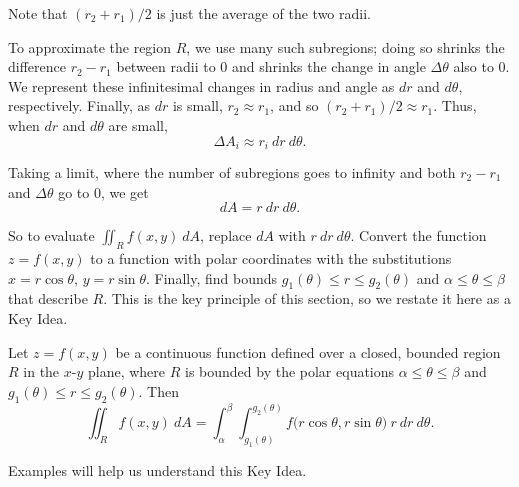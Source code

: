 Note that $(r_2+r_1)/2$ is just the average of the two radii. 

To approximate the region $R$, we use many such subregions; doing so shrinks the difference $r_2-r_1$ between radii to 0 and shrinks the change in angle $\Delta \theta$ also to 0. We represent these infinitesimal changes in radius and angle as $dr$ and $d\theta$, respectively. Finally, as $dr$ is small, $r_2\approx r_1$, and so $(r_2+r_1)/2\approx r_1$. Thus, when $dr$ and $d\theta$ are small, 
\[
\Delta A_i \approx r_i\ dr\ d\theta.
\]

Taking a limit, where the number of subregions goes to infinity and both $r_2-r_1$ and $\Delta\theta$ go to 0, we get 
\[
dA = r\ dr\ d\theta.
\]

So to evaluate $\iint_Rf(x,y)\ dA$, replace $dA$ with $r\ dr\ d\theta$. Convert the function $z=f(x,y)$ to a function with polar coordinates with the substitutions $x=r\cos\theta$, $y=r\sin\theta$. Finally, find bounds $g_1(\theta)\leq r\leq g_2(\theta)$ and $\alpha\leq\theta\leq\beta$ that describe $R$. This is the key principle of this section, so we restate it here as a Key Idea.

{Let $z=f(x,y)$ be a continuous function defined over a closed, bounded region $R$ in the $x$-$y$ plane, where $R$ is
bounded by the polar equations $\alpha\leq\theta\leq\beta$ and  $g_1(\theta)\leq r\leq g_2(\theta)$. Then
\[
\iint_Rf(x,y)\ dA = \int_\alpha^\beta\int_{g_1(\theta)}^{g_2(\theta)} f\big(r\cos\theta,r\sin\theta\big)\ r\ dr\ d\theta.
\]
}

Examples will help us understand this Key Idea.\\

